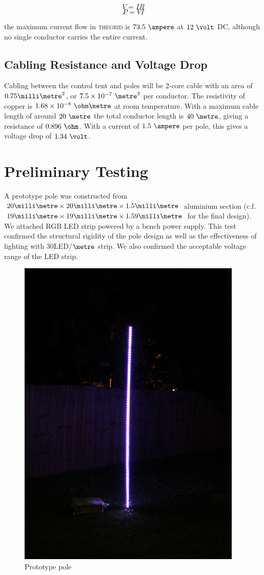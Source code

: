 \documentclass[12pt]{article} %
\newcommand{\thegrid}{\textsc{the\textperiodcentered grid}\xspace}
\begin{document}
\begin{appendices}
$$ V = IR $$
$$ P = VI $$

the maximum current flow in \thegrid is $73.5~\ampere$ at $12~\volt$ DC,
although no single conductor carries the entire current.

\subsection{Cabling Resistance and Voltage Drop}
\label{app:cabledrop}
Cabling between the control tent and poles will be 2-core cable with an area of
$0.75\milli\metre^2$, or $7.5 \times 10^{-7}~\metre^2$ per conductor.  The
resistivity of copper is $1.68 \times 10^{-8}~\ohm\metre$ at room temperature.
With a maximum cable length of around $20~\metre$ the total conductor length is
$40~\metre$, giving a resistance of $0.896~\ohm$.  With a current of
$1.5~\ampere$ per pole, this gives a voltage drop of $1.34~\volt$.

\clearpage
\section{Preliminary Testing}
A prototype pole was constructed from $20\milli\metre \times 20\milli\metre
\times 1.5\milli\metre$ aluminium section (c.f. $19\milli\metre \times
19\milli\metre \times 1.59\milli\metre$ for the final design).  We attached RGB
LED strip powered by a bench power supply.  This test confirmed the structural
rigidity of the pole design as well as the effectiveness of lighting with
30LED/$\metre$ strip.  We also confirmed the acceptable voltage range of the
LED strip.

\begin{figure}[h]
    \centering
    \includegraphics[height=15cm]{pics/protopole.jpg}
    \caption{Prototype pole}
\end{figure}


\end{appendices}
\end{document}
